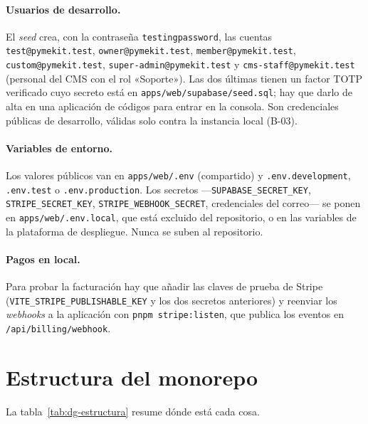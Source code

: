 \paragraph{Usuarios de desarrollo.} El \textit{seed} crea, con la contraseña
\texttt{testingpassword}, las cuentas \texttt{test@pymekit.test},
\texttt{owner@pymekit.test}, \texttt{member@pymekit.test},
\texttt{custom@pymekit.test}, \texttt{super-admin@pymekit.test} y
\texttt{cms-staff@pymekit.test} (personal del CMS con el rol «Soporte»). Las dos
últimas tienen un factor TOTP verificado cuyo secreto está en
\texttt{apps/web/supabase/seed.sql}; hay que darlo de alta en una aplicación de
códigos para entrar en la consola. Son credenciales públicas de desarrollo,
válidas solo contra la instancia local (B-03).

\paragraph{Variables de entorno.} Los valores públicos van en
\texttt{apps/web/.env} (compartido) y \texttt{.env.development},
\texttt{.env.test} o \texttt{.env.production}. Los secretos
---\texttt{SUPABASE\_SECRET\_KEY}, \texttt{STRIPE\_SECRET\_KEY},
\texttt{STRIPE\_WEBHOOK\_SECRET}, credenciales del correo--- se ponen en
\texttt{apps/web/.env.local}, que está excluido del repositorio, o en las
variables de la plataforma de despliegue. Nunca se suben al repositorio.

\paragraph{Pagos en local.} Para probar la facturación hay que añadir las
claves de prueba de Stripe (\texttt{VITE\_STRIPE\_PUBLISHABLE\_KEY} y los dos
secretos anteriores) y reenviar los \textit{webhooks} a la aplicación con
\texttt{pnpm stripe:listen}, que publica los eventos en
\texttt{/api/billing/webhook}.

\section{Estructura del monorepo}
\label{sec:dg-estructura}

La tabla~\ref{tab:dg-estructura} resume dónde está cada cosa.

